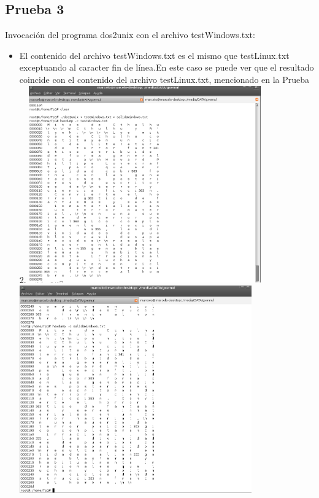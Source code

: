 \documentclass[a4paper,10pt]{article}
\begin{document}
    \subsection{Prueba 3}
    Invocaci\'on del programa dos2unix con el archivo testWindows.txt:
    \begin{itemize}
     \item El contenido del archivo testWindows.txt es el mismo que testLinux.txt exceptuando al caracter fin de l\'inea.En este caso se puede ver que el resultado coincide con el contenido del archivo testLinux.txt, mencionado en la Prueba 2.
     \newline
      \includegraphics[width=10cm, viewport=0 0 1018 864]{Imagenes/testWindows.png}
     \newline
      \includegraphics[width=10cm, viewport=0 0 987 882]{Imagenes/salidaWindows.png}
    \end{itemize}
\end{document}
